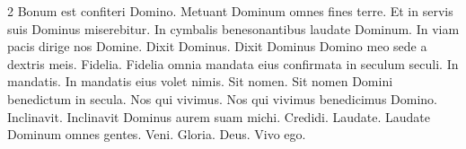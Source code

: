 \begin{multicols*}{2}
 Bonum est confiteri Domino.
 Metuant Dominum omnes fines terre.
 Et in servis suis Dominus miserebitur.
 In cymbalis benesonantibus laudate Dominum.
 In viam pacis dirige nos Domine.
 Dixit Dominus.
 Dixit Dominus Domino meo sede a dextris meis.
 Fidelia.
 Fidelia omnia mandata eius confirmata in seculum seculi.
 In mandatis.
 In mandatis eius volet nimis.
 Sit nomen.
 Sit nomen Domini benedictum in secula.
 Nos qui vivimus.
 Nos qui vivimus benedicimus Domino.
 Inclinavit.
 Inclinavit Dominus aurem suam michi.
 Credidi.
 Laudate.
 Laudate Dominum omnes gentes.
 Veni.
 Gloria.
 Deus.
 Vivo ego.

\end{multicols*}

